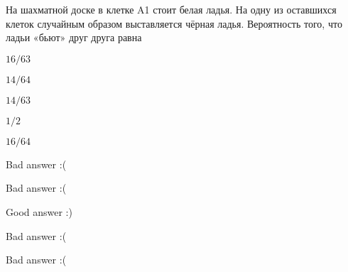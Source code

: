 
\begin{question}
На шахматной доске в клетке A1 стоит белая ладья. На одну из оставшихся
клеток случайным образом выставляется чёрная ладья. Вероятность того,
что ладьи «бьют» друг друга равна
\begin{answerlist}
  \item \(16/63\)
  \item \(14/64\)
  \item \(14/63\)
  \item \(1/2\)
  \item \(16/64\)
\end{answerlist}
\end{question}

\begin{solution}
\begin{answerlist}
  \item Bad answer :(
  \item Bad answer :(
  \item Good answer :)
  \item Bad answer :(
  \item Bad answer :(
\end{answerlist}
\end{solution}

